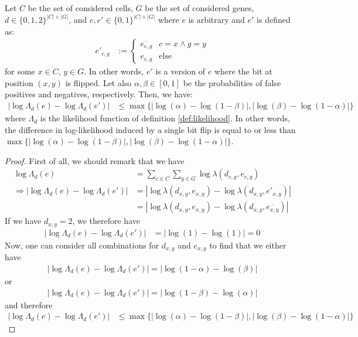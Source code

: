 \begin{lemma}
    \label{lem:bitflip}
    Let $C$ be the set of considered cells, $G$ be the set of considered genes, $d \in \{0,1,2\}^{|C| \times |G|}$, and $e, e' \in \{0,1\}^{|C| \times |G|}$ where $e$ is arbitrary and $e'$ is defined as:
    \begin{align*}
        e'_{c,g} &:= \begin{cases}
            \overline{e_{c,g}} & c = x \wedge g = y \\
            e_{c,g} & \text{else}
        \end{cases}
    \end{align*}
    for some $x \in C$, $y \in G$. In other words, $e'$ is a version of $e$ where the bit at position $(x,y)$ is flipped. Let also $\alpha, \beta \in [0,1]$ be the probabilities of false positives and negatives, respectively. Then, we have:
    \begin{align*}
        |\log\Lambda_d(e) - \log\Lambda_d(e')| &\leq \max\{|\log(\alpha) - \log(1-\beta)|, |\log(\beta) - \log(1-\alpha)|\}
    \end{align*}
    where $\Lambda_d$ is the likelihood function of definition \ref{def:likelihood}. In other words, the difference in log-likelihood induced by a single bit flip is equal to or less than $\max\{|\log(\alpha) - \log(1-\beta)|, |\log(\beta) - \log(1-\alpha)|\}$.
\end{lemma}

\begin{proof}
    First of all, we should remark that we have
    \begin{align*}
        \log\Lambda_d(e) &= \sum_{c \in C} \sum_{g \in G} \log\lambda(d_{c,g}, e_{c,g}) \\
        \Rightarrow |\log\Lambda_d(e) - \log\Lambda_d(e')| &= |\log\lambda(d_{x,y}, e_{x,y}) - \log\lambda(d_{x,y}, e'_{x,y})| \\
        &= |\log\lambda(d_{x,y}, e_{x,y}) - \log\lambda(d_{x,y}, \overline{e_{x,y}})|
    \end{align*}
    If we have $d_{x,y} = 2$, we therefore have
    \begin{align*}
        |\log\Lambda_d(e) - \log\Lambda_d(e')| &= |\log(1) - \log(1)| = 0
    \end{align*}
    Now, one can consider all combinations for $d_{x,y}$ and $e_{x,y}$ to find that we either have 
    \begin{align*}
        |\log\Lambda_d(e) - \log\Lambda_d(e')| = |\log(1-\alpha) - \log(\beta)|
    \end{align*}
    or
    \begin{align*}
        |\log\Lambda_d(e) - \log\Lambda_d(e')| = |\log(1-\beta) - \log(\alpha)|
    \end{align*}
    and therefore
    \begin{align*}
        |\log\Lambda_d(e) - \log\Lambda_d(e')| &\leq \max\{|\log(\alpha) - \log(1-\beta)|, |\log(\beta) - \log(1-\alpha)|\}
    \end{align*}
\end{proof}

